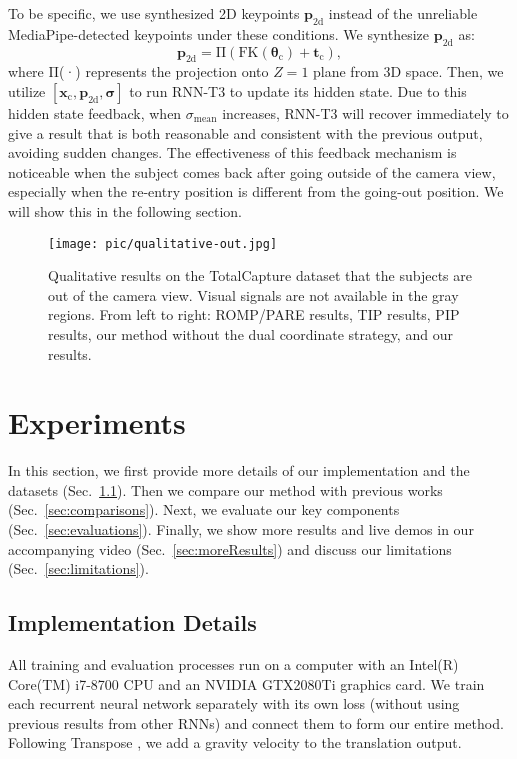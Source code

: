 \documentclass[sigconf,nonacm=true]{acmart}
\begin{document}
To be specific, we use synthesized 2D keypoints $\boldsymbol{p}_\mathrm{2d}$ instead of the unreliable MediaPipe-detected keypoints under these conditions.
We synthesize $\boldsymbol{p}_\mathrm{2d}$ as:
\begin{equation}
    \boldsymbol{p}_\mathrm{2d} = \mathrm{\Pi}\left(\mathrm{FK}\left(\boldsymbol{\theta}_\mathrm{c}\right)+\boldsymbol{t}_\mathrm{c}\right),
\end{equation}
where $\mathrm{\Pi}$(·) represents the projection onto $Z=1$ plane from 3D space.
Then, we utilize $[\boldsymbol{x}_{\mathrm{c}},\boldsymbol{p}_{\mathrm{2d}},\boldsymbol{\sigma}]$ to run RNN-T3 to update its hidden state.
Due to this hidden state feedback, when $\sigma_\mathrm{mean}$ increases, RNN-T3 will recover immediately to give a result that is both reasonable and consistent with the previous output, avoiding sudden changes.
The effectiveness of this feedback mechanism is noticeable when the subject comes back after going outside of the camera view, especially when the re-entry position is different from the going-out position. We will show this in the following section.
% 
\begin{figure}
\texttt{[image: pic/qualitative-out.jpg]}
  \centering
  \caption{
   Qualitative results on the TotalCapture dataset that the subjects are out of the camera view. Visual signals are not available in the gray regions. From left to right: ROMP/PARE results, TIP results, PIP results, our method without the dual coordinate strategy, and our results.}
\label{fig:comparison2}
\end{figure}
\section{Experiments}
In this section, we first provide more details of our implementation and the datasets (Sec.~\ref{sec:implementation}).
Then we compare our method with previous works (Sec.~\ref{sec:comparisons}).
Next, we evaluate our key components (Sec.~\ref{sec:evaluations}).
Finally, we show more results and live demos in our accompanying video (Sec.~\ref{sec:moreResults}) and discuss our limitations (Sec.~\ref{sec:limitations}).
\subsection{Implementation Details}\label{sec:implementation}
All training and evaluation processes run on a computer with an Intel(R) Core(TM) i7-8700 CPU and an NVIDIA GTX2080Ti graphics card.
We train each recurrent neural network separately with its own loss (without using previous results from other RNNs) and connect them to form our entire method.
Following Transpose \cite{TransPose}, we add a gravity velocity to the translation output.
\end{document}
